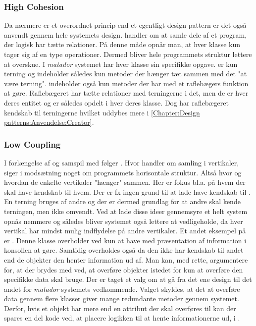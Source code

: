 \subsubsection{High Cohesion}\label{Chapter:Design patterns:Anvendelse:High Cohesion}
Da  nærmere er et overordnet princip end et egentligt design pattern er det også anvendt gennem hele systemets design.  handler om at samle dele af et program, der logisk har tætte relationer. På denne måde opnår man, at hver klasse kun tager sig af en type operationer. Dermed bliver hele programmets struktur lettere at overskue. I \textit{matador} systemet har hver klasse sin specifikke opgave.  er kun terning og indeholder således kun metoder der hænger tæt sammen med det "at være terning".  indeholder også kun metoder der har med et raflebægers funktion at gøre. Raflebægeret har tætte relationer med terningerne i det, men de er hver deres entitet og er således opdelt i hver deres klasse. Dog har raflebægeret kendskab til terningerne hvilket uddybes mere i \vref{Chapter:Design patterns:Anvendelse:Creator}.       

\subsubsection{Low Coupling}\label{Chapter:Design patterns:Anvendelse:Low Coupling}
I forlængelse af og samspil med  følger . Hvor  handler om samling i vertikaler, siger  i modsætning noget om programmets horisontale struktur. Altså hvor og hvordan de enkelte vertikaler "hænger" sammen. Her er fokus bl.a. på hvem der skal have kendskab til hvem. Der er fx ingen grund til at lade  have kendskab til . En terning bruges af andre og der er dermed grundlag for at andre skal kende terningen, men ikke omvendt. Ved at lade disse ideer gennemsyre et helt system opnås  nemmere og således bliver systemet også lettere at vedligeholde, da hver vertikal har mindst mulig indflydelse på andre vertikaler. Et andet eksempel på  er . Denne klasse overholder  ved kun at have med præsentation af information i konsollen at gøre. Samtidig overholdes også  da den ikke har kendskab til andet end de objekter den henter information ud af. Man kan, med rette, argumentere for, at der brydes med  ved, at overføre objekter istedet for kun at overføre den specifikke data  skal bruge. Der er taget et valg om at gå fra det ene design til det andet for \textit{matador} systemets vedkommende. Valget skyldes, at det at overføre data gennem flere klasser giver mange redundante metoder gennem systemet. Derfor, hvis et objekt har mere end en attribut der skal overføres til  kan der spares en del kode ved, at placere logikken til at hente informationerne ud, i .   

